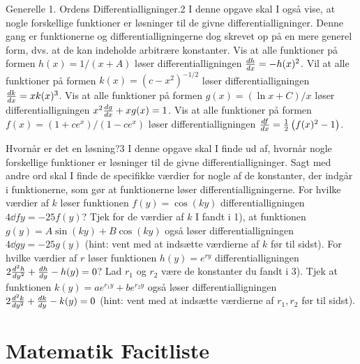 \begin{opgave}{Generelle 1. Ordens Differentialligninger.}{2}
I denne opgave skal I også vise, at nogle forskellige funktioner er løsninger til de givne differentialligninger. Denne gang er funktionerne og differentialligningerne dog skrevet op på en mere generel form, dvs. at de kan indeholde arbitrære konstanter.
\opg Vis at alle funktioner på formen $h(x) = 1 / \left( x + A \right)$ løser differentialligningen ${d{h} \over d{x}} = - h(x)^2$.
\opg Vil at alle funktioner på formen $k(x) = \left( c - x^2 \right)^{-1/2}$ løser differentialligningen ${d{k} \over d{x}} = x k(x)^3$.
\opg Vis at alle funktioner på formen $g(x) = \left( \ln x + C \right) / x$ løser differentialligningen $x^2 {d{g} \over d{x}} + xg(x) = 1$. 
\opg Vis at alle funktioner på formen $f(x) = (1 + ce^x) / (1-ce^x)$ løser differentialligningen ${d{f} \over d{x}} = \frac{1}{2} \left( f(x)^2 - 1 \right)$. 
\end{opgave}

\begin{opgave}{Hvornår er det en løsning?}{3}
I denne opgave skal I finde ud af, hvornår nogle forskellige funktioner er løsninger til de givne differentialligninger. Sagt med andre ord skal I finde de specifikke værdier for nogle af de konstanter, der indgår i funktionerne, som gør at funktionerne løser differentialligningerne.
\opg For hvilke værdier af $k$ løser funktionen $f(y) = \cos (ky)$ differentialligningen $4 \dd{f}{y} = - 25f(y)$?
\opg Tjek for de værdier af $k$ I fandt i 1), at funktionen $g(y) = A \sin (ky) + B \cos (ky)$ også løser differentialligningen $4 \dd{g}{y} = -25 g(y)$ (hint: vent med at indsætte værdierne af $k$ før til sidst).
\opg For hvilke værdier af $r$ løser funktionen $h(y) = e^{ry}$ differentialligningen $2 {d^2{h} \over d{y}^2} + {d{h} \over d{y}} - h(y) = 0$?
\opg Lad $r_1$ og $r_2$ være de konstanter du fandt i 3). Tjek at funktionen $k (y) = ae^{r_1y} + be^{r_2y} $ også løser differentialligningen $2 {d^2{k} \over d{y}^2} + {d{k} \over d{y}} - k(y) = 0$ (hint: vent med at indsætte værdierne af $r_1,r_2$ før til sidst).
\end{opgave}


\newpage

\chapter{Matematik Facitliste}
